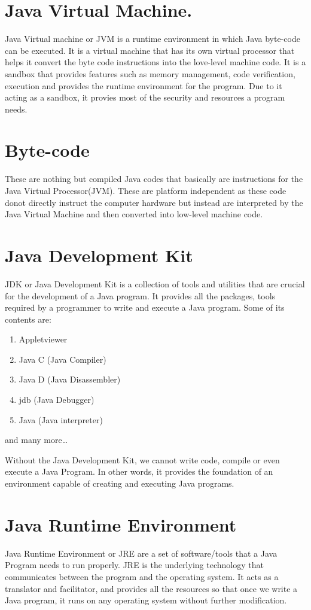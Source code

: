 \documentclass[a4paper, 12pt]{scrarticle}
\begin{document}
\section{Java Virtual Machine.}
Java Virtual machine or JVM is a runtime environment in which Java byte-code can be executed. It is a virtual machine that has its own virtual processor that helps it convert the byte code instructions into the love-level machine code. It is a sandbox that provides features such as memory management, code verification, execution and provides the runtime environment for the program. Due to it acting as a sandbox, it provies most of the security and resources a program needs.

\section{Byte-code}
These are nothing but compiled Java codes that basically are instructions for the Java Virtual Processor(JVM). These are platform independent as these code donot directly instruct the computer hardware but instead are interpreted by the Java Virtual Machine and then converted into low-level machine
code.

\section{Java Development Kit}
JDK or Java Development Kit is a collection of tools and utilities that are crucial for the development of a Java program. It provides all the packages, tools required by a programmer to write and execute a Java program. Some of its contents are:
\begin{enumerate}
  \item Appletviewer
  \item Java C (Java Compiler)
  \item Java D (Java Disassembler)
  \item jdb (Java Debugger)
  \item Java (Java interpreter)
\end{enumerate}
and many more\dots

Without the Java Development Kit, we cannot write code, compile or even execute a Java Program. In other words, it provides the foundation of an environment capable of creating and executing Java programs.

\section{Java Runtime Environment}
Java Runtime Environment or JRE are a set of software/tools that a Java Program needs to run properly. JRE is the underlying technology that communicates between the program and the operating system. It acts as a translator and facilitator, and provides all the resources so that once we write a Java
program, it runs on any operating system without further modification.
\end{document}
